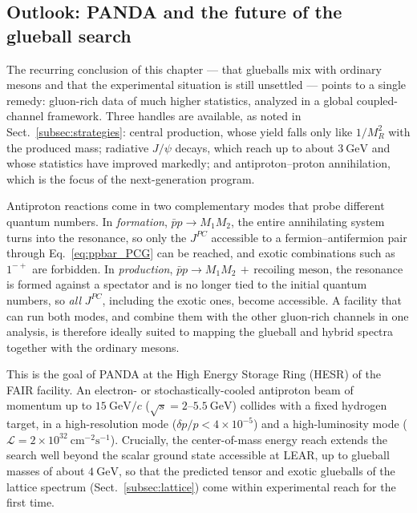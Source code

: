\FloatBarrier

\subsection{Outlook: PANDA and the future of the glueball search}
\label{subsec:outlook}

The recurring conclusion of this chapter --- that glueballs mix with ordinary
mesons and that the experimental situation is still unsettled --- points to a
single remedy: gluon-rich data of much higher statistics, analyzed in a global
coupled-channel framework. Three handles are available, as noted in
Sect.~\ref{subsec:strategies}: central production, whose yield falls only like
$1/M_R^2$ with the produced mass; radiative $J/\psi$ decays, which reach up to
about $3~\mathrm{GeV}$ and whose statistics have improved markedly; and
antiproton--proton annihilation, which is the focus of the next-generation
program.

Antiproton reactions come in two complementary modes that probe different quantum
numbers. In \emph{formation}, $\bar p p\to M_1 M_2$, the entire annihilating
system turns into the resonance, so only the $J^{PC}$ accessible to a
fermion--antifermion pair through Eq.~\eqref{eq:ppbar_PCG} can be reached, and
exotic combinations such as $1^{-+}$ are forbidden. In \emph{production},
$\bar p p\to M_1 M_2\,+\,\text{recoiling meson}$, the resonance is formed against
a spectator and is no longer tied to the initial quantum numbers, so \emph{all}
$J^{PC}$, including the exotic ones, become accessible. A facility that can run
both modes, and combine them with the other gluon-rich channels in one analysis,
is therefore ideally suited to mapping the glueball and hybrid spectra together
with the ordinary mesons.

This is the goal of PANDA at the High Energy Storage Ring (HESR) of the FAIR
facility. An electron- or stochastically-cooled antiproton beam of momentum up to
$15~\mathrm{GeV}/c$ ($\sqrt s = 2$--$5.5~\mathrm{GeV}$) collides with a fixed
hydrogen target, in a high-resolution mode
($\delta p/p < 4\times10^{-5}$) and a high-luminosity mode
($\mathcal L = 2\times10^{32}~\mathrm{cm^{-2}s^{-1}}$). Crucially, the
center-of-mass energy reach extends the search well beyond the scalar ground
state accessible at LEAR, up to glueball masses of about $4~\mathrm{GeV}$, so that
the predicted tensor and exotic glueballs of the lattice spectrum
(Sect.~\ref{subsec:lattice}) come within experimental reach for the first time.

